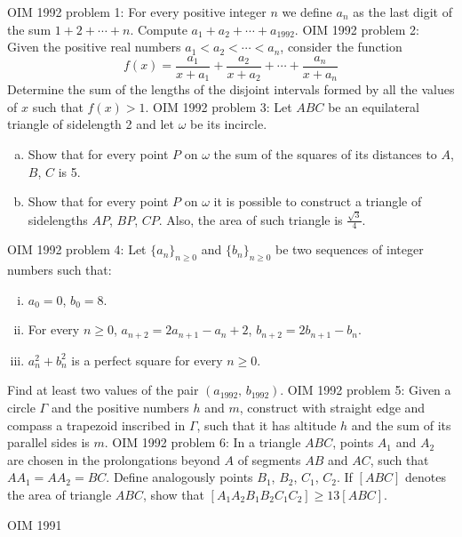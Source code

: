 OIM 1992 problem 1:  For every positive integer $n$ we define $a_n$ as the last digit of the sum $1+2+\cdots+n$. Compute $a_1+a_2+\cdots+a_{1992}$. 
OIM 1992 problem 2:  Given the positive real numbers $a_1<a_2<\cdots<a_n$, consider the function
\[ f(x)=\frac{a_1}{x+a_1}+\frac{a_2}{x+a_2}+\cdots+\frac{a_n}{x+a_n} \]
Determine the sum of the lengths of the disjoint intervals formed by all the values of $x$ such that $f(x)>1$. 
OIM 1992 problem 3:  Let $ABC$ be an equilateral triangle of sidelength 2 and let $\omega$ be its incircle.
\begin{enumerate}[a)]
  \item Show that for every point $P$ on $\omega$ the sum of the squares of its distances to $A$, $B$, $C$ is 5.
  \item Show that for every point $P$ on $\omega$ it is possible to construct a triangle of sidelengths $AP$, $BP$, $CP$. Also, the area of such triangle is $\frac{\sqrt{3}}{4}$.
\end{enumerate} 
OIM 1992 problem 4:  Let $\{a_n\}_{n \geq 0}$ and $\{b_n\}_{n \geq 0}$ be two sequences of integer numbers such that:
\begin{enumerate}[i.]
  \item $a_0=0$, $b_0=8$.
  \item For every $n \geq 0$, $a_{n+2}=2a_{n+1}-a_n+2$, $b_{n+2}=2b_{n+1}-b_n$.
  \item $a_n^2+b_n^2$ is a perfect square for every $n \geq 0$.
\end{enumerate}
Find at least two values of the pair $(a_{1992},\, b_{1992})$. 
OIM 1992 problem 5:  Given a circle $\Gamma$ and the positive numbers $h$ and $m$,  construct with straight edge and compass a trapezoid inscribed in $\Gamma$, such that it has altitude  $h$ and the sum of its parallel sides is $m$. 
OIM 1992 problem 6:  In a triangle $ABC$, points $A_1$ and $A_2$ are chosen in the prolongations beyond $A$ of segments $AB$ and $AC$, such that $AA_1=AA_2=BC$. Define analogously points $B_1$, $B_2$, $C_1$, $C_2$. If $[ABC]$ denotes the area of triangle $ABC$, show that $[A_1A_2B_1B_2C_1C_2] \geq 13 [ABC]$. 

OIM 1991 

